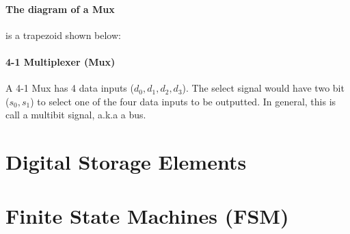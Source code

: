 \documentclass[11pt]{report}
\begin{document}
\paragraph{The diagram of a Mux} is a trapezoid shown below:
\begin{center}
\end{center}

\paragraph{4-1 Multiplexer (Mux)} A 4-1 Mux has 4 data inputs ($d_0, d_1, d_2, d_3$). The select signal would have two bit ($s_0, s_1$) to select one of the four data inputs to be outputted. In general, this is call a multibit signal, a.k.a a bus.
\begin{definition}
    
\end{definition}



\section{Digital Storage Elements}

\section{Finite State Machines (FSM)}
\end{document}
